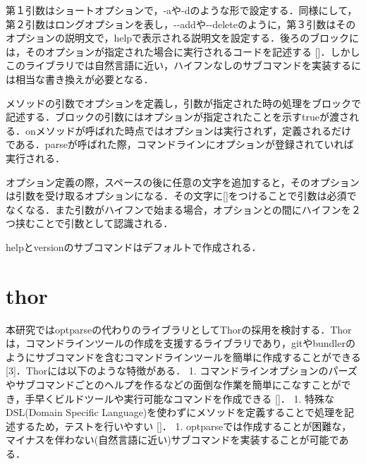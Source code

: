 第１引数はショートオプションで，-aや-dのような形で設定する．同様にして，第２引数はロングオプションを表し，-\/-addや-\/-deleteのように，第３引数はそのオプションの説明文で，helpで表示される説明文を設定する．後ろのブロックには，そのオプションが指定された場合に実行されるコードを記述する
{[}{]}．しかしこのライブラリでは自然言語に近い，ハイフンなしのサブコマンドを実装するには相当な書き換えが必要となる．

メソッドの引数でオプションを定義し，引数が指定された時の処理をブロックで記述する．ブロックの引数にはオプションが指定されたことを示すtrueが渡される．onメソッドが呼ばれた時点ではオプションは実行されず，定義されるだけである．parseが呼ばれた際，コマンドラインにオプションが登録されていれば実行される．

オプション定義の際，スペースの後に任意の文字を追加すると，そのオプションは引数を受け取るオプションになる．その文字に{[}{]}をつけることで引数は必須でなくなる．また引数がハイフンで始まる場合，オプションとの間にハイフンを２つ挟むことで引数として認識される．

helpとversionのサブコマンドはデフォルトで作成される．

\section{thor}\label{thor}

本研究ではoptparseの代わりのライブラリとしてThorの採用を検討する．Thorは，コマンドラインツールの作成を支援するライブラリであり，gitやbundlerのようにサブコマンドを含むコマンドラインツールを簡単に作成することができる
{[}3{]}．Thorには以下のような特徴がある． 1.
コマンドラインオプションのパーズやサブコマンドごとのヘルプを作るなどの面倒な作業を簡単にこなすことができ，手早くビルドツールや実行可能なコマンドを作成できる
{[}{]}． 1. 特殊なDSL(Domain Specific
Language)を使わずにメソッドを定義することで処理を記述するため，テストを行いやすい
{[}{]}． 1.
optparseでは作成することが困難な，マイナスを伴わない(自然言語に近い)サブコマンドを実装することが可能である．

\begin{Shaded}
\begin{Highlighting}[]
\NormalTok{, }
\NormalTok{ => }
\OtherTok{#\{}\OtherTok{\}}\OtherTok{#\{}\NormalTok{help[}\NormalTok{][}\NormalTok{]}\OtherTok{\}}
\NormalTok{      \}}
\end{Highlighting}
\end{Shaded}

